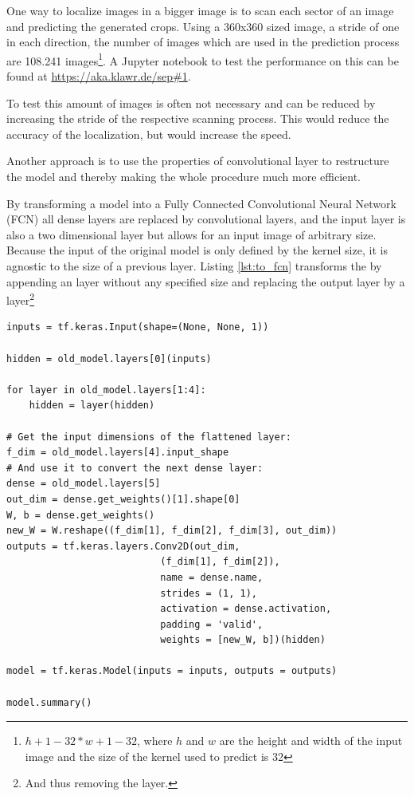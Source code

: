 One way to localize images in a bigger image is to scan each sector of an image and predicting the generated crops.
Using a 360x360 sized image, a stride of one in each direction, the number of images which are used in the prediction process are 108.241 images\footnote{$h + 1 - 32 * w + 1 - 32$, where $h$ and $w$ are the height and width of the input image and the size of the kernel used to predict is 32}.
A Jupyter notebook to test the performance on this can be found at \url{https://aka.klawr.de/sep#1}. %

To test this amount of images is often not necessary and can be reduced by increasing the stride of the respective scanning process.
This would reduce the accuracy of the localization, but would increase the speed.

Another approach is to use the properties of convolutional layer to restructure the model and thereby making the whole procedure much more efficient.

By transforming a model into a Fully Connected Convolutional Neural Network (FCN) all dense layers are replaced by convolutional layers, and the input layer is also a two dimensional layer but allows for an input image of arbitrary size.
Because the input of the original model is only defined by the kernel size, it is agnostic to the size of a previous layer.
Listing \ref{lst:to_fcn} transforms the  by appending an  layer without any specified size and replacing the output layer by a  layer\footnote{And thus removing the  layer.}

\begin{lstlisting}[caption={Transformation into a FCN}, label=lst:to_fcn]
inputs = tf.keras.Input(shape=(None, None, 1))

hidden = old_model.layers[0](inputs)

for layer in old_model.layers[1:4]:
    hidden = layer(hidden)

# Get the input dimensions of the flattened layer:
f_dim = old_model.layers[4].input_shape
# And use it to convert the next dense layer:
dense = old_model.layers[5]
out_dim = dense.get_weights()[1].shape[0]
W, b = dense.get_weights()
new_W = W.reshape((f_dim[1], f_dim[2], f_dim[3], out_dim))
outputs = tf.keras.layers.Conv2D(out_dim,
                           (f_dim[1], f_dim[2]),
                           name = dense.name,
                           strides = (1, 1),
                           activation = dense.activation,
                           padding = 'valid',
                           weights = [new_W, b])(hidden)

model = tf.keras.Model(inputs = inputs, outputs = outputs)

model.summary()
\end{lstlisting}

